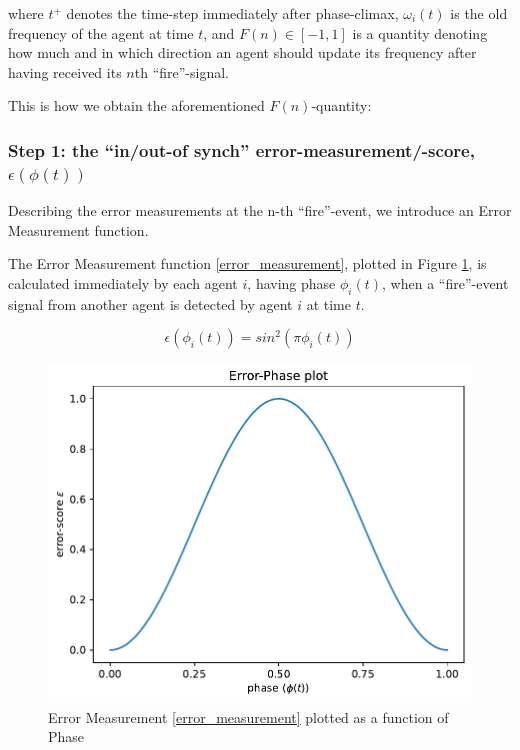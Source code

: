 	where $t^+$ denotes the time-step immediately after phase-climax, $\omega_i(t)$ is the old frequency of the agent at time $t$, and $F(n) \in [-1,1]$ is a quantity denoting how much and in which direction an agent should update its frequency after having received its $n$th ``fire''-signal.
	
	This is how we obtain the aforementioned $F(n)$-quantity:
	
	
	\subsubsection{Step 1: the ``in/out-of synch'' error-measurement/-score, $\epsilon(\phi(t))$}
	
	Describing the error measurements at the n-th ``fire''-event, we introduce an Error Measurement function.
	
	The Error Measurement function \eqref{error_measurement}, plotted in Figure \ref{fig:error_measurement}, is calculated immediately by each agent $i$, having phase $\phi_i(t)$, when a ``fire''-event signal from another agent is detected by agent $i$ at time $t$.
	
	\begin{equation}
	\label{error_measurement}
		\epsilon(\phi_i(t)) = sin^2(\pi\phi_i(t))
	\end{equation} \nl
	
	\begin{figure}[ht!]
		\centering
		\includegraphics[width=0.8\linewidth]{Assets/Figures/PhaseErrorFunction.pdf}
		\caption{Error Measurement \eqref{error_measurement} plotted as a function of Phase}
		\label{fig:error_measurement}
	\end{figure}
	
